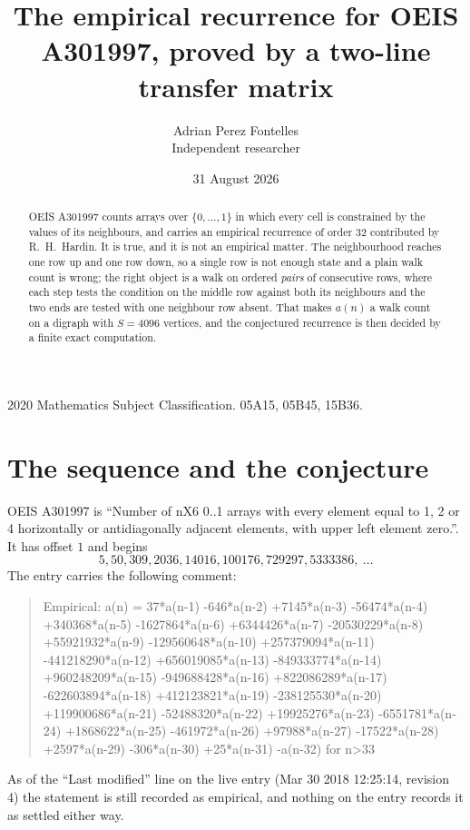 \documentclass[11pt,a4paper]{article}
\title{The empirical recurrence for OEIS A301997, proved by a two-line transfer matrix}
\author{Adrian Perez Fontelles\\ \small Independent researcher}
\date{31 August 2026}
\theoremstyle{plain}
\theoremstyle{definition}
\begin{document}
\maketitle

\begin{abstract}
OEIS A301997 counts arrays over $\{0,\dots,1\}$ in which every cell is constrained by the
values of its neighbours, and carries an empirical recurrence of order $32$ contributed
by R.~H.~Hardin. It is true, and it is not an empirical matter. The neighbourhood reaches one
row up and one row down, so a single row is not enough state and a plain walk count
is wrong; the right object is a walk on ordered \emph{pairs} of consecutive rows, where
each step tests the condition on the middle row against both its neighbours and the two
ends are tested with one neighbour row absent. That makes $a(n)$ a walk count on a digraph
with $S=4096$ vertices, and the conjectured recurrence is then decided by a finite exact
computation.
\end{abstract}

\noindent\small 2020 Mathematics Subject Classification. 05A15, 05B45, 15B36.\normalsize

\section{The sequence and the conjecture}

OEIS A301997 is ``Number of nX6 0..1 arrays with every element equal to 1, 2 or 4 horizontally or antidiagonally adjacent elements, with upper left element zero.''. It has offset $1$ and begins
\[
5, 50, 309, 2036, 14016, 100176, 729297, 5333386,\ \dots
\]
The entry carries the following comment:
\begin{quote}\small
Empirical: a(n) = 37*a(n-1) -646*a(n-2) +7145*a(n-3) -56474*a(n-4) +340368*a(n-5) -1627864*a(n-6) +6344426*a(n-7) -20530229*a(n-8) +55921932*a(n-9) -129560648*a(n-10) +257379094*a(n-11) -441218290*a(n-12) +656019085*a(n-13) -849333774*a(n-14) +960248209*a(n-15) -949688428*a(n-16) +822086289*a(n-17) -622603894*a(n-18) +412123821*a(n-19) -238125530*a(n-20) +119900686*a(n-21) -52488320*a(n-22) +19925276*a(n-23) -6551781*a(n-24) +1868622*a(n-25) -461972*a(n-26) +97988*a(n-27) -17522*a(n-28) +2597*a(n-29) -306*a(n-30) +25*a(n-31) -a(n-32) for n>33
\end{quote}
As of the ``Last modified'' line on the live entry (Mar 30 2018 12:25:14, revision 4) the statement is
still recorded as empirical, and nothing on the entry records it as settled either way.
\end{document}
